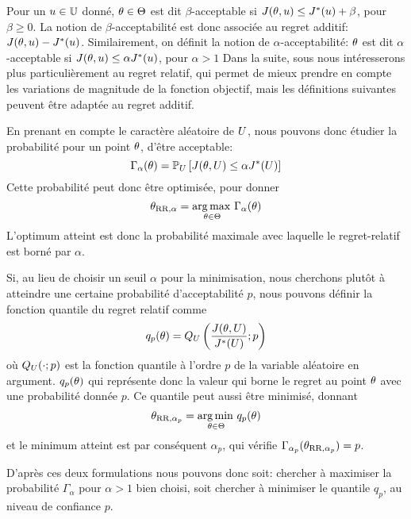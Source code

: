 \documentclass[../../Main_ManuscritThese.tex]{subfiles}
\begin{document}
Pour un $u\in\mathbb{U}$ donné, $\theta\in\Theta$ est dit
$\beta$-acceptable si $J(\theta, u) \leq J^*(u) + \beta$, pour
$\beta \geq 0$. La notion de $\beta$-acceptabilité est donc associée
au regret additif: $J(\theta, u) - J^*(u)$.  Similairement, on
définit la notion de $\alpha$-acceptabilité: $\theta$ est dit
$\alpha$-acceptable si $J(\theta, u) \leq \alpha J^*(u)$, pour
$\alpha > 1$ Dans la suite, sous nous intéresserons plus
particulièrement au regret relatif, qui permet de mieux prendre en
compte les variations de magnitude de la fonction objectif, mais les
définitions suivantes peuvent être adaptée au regret additif.


En prenant en compte le caractère aléatoire de $U$, nous pouvons
donc étudier la probabilité pour un point $\theta$, d'être acceptable:
\begin{equation*}
\Gamma_{\alpha}(\theta) = \mathbb{P}_{U}\left[J(\theta,U) \leq \alpha J^*(U) \right]
\end{equation*}
Cette probabilité peut donc être optimisée, pour donner
\begin{equation*}
  \theta_{\mathrm{RR},\alpha} = \operatorname*{arg\,max \,}_{\theta \in\Theta} \Gamma_\alpha(\theta)
\end{equation*}
L'optimum atteint est donc la probabilité maximale avec laquelle le
regret-relatif est borné par $\alpha$.


Si, au lieu de choisir un seuil $\alpha$ pour la minimisation, nous
cherchons plutôt à atteindre une certaine probabilité d'acceptabilité
$p$, nous pouvons définir la fonction quantile du regret relatif comme
\begin{equation*}
  q_p(\theta) = Q_{U}\left(\frac{J(\theta,U)}{J^*(U)};p\right)
\end{equation*}
où $Q_{U}(\cdot;p)$ est la fonction quantile à l'ordre $p$ de la
variable aléatoire en argument. $q_p(\theta)$ qui représente donc la valeur qui
borne le regret au point $\theta$ avec une probabilité donnée $p$.
Ce quantile peut aussi être minimisé, donnant
\begin{equation*}
  \theta_{\mathrm{RR},\alpha_p} = \operatorname*{arg\,min \,}_{\theta \in \Theta} q_p(\theta)
\end{equation*}
et le minimum atteint est par conséquent $\alpha_p$, qui vérifie
$\Gamma_{\alpha_p}(\theta_{\mathrm{RR},\alpha_p}) = p$.
  
D'après ces deux formulations nous pouvons donc soit: chercher à
maximiser la probabilité $\Gamma_{\alpha}$ pour $\alpha > 1$ bien
choisi, soit chercher à minimiser le quantile $q_p$, au niveau de
confiance $p$.
\end{document}
